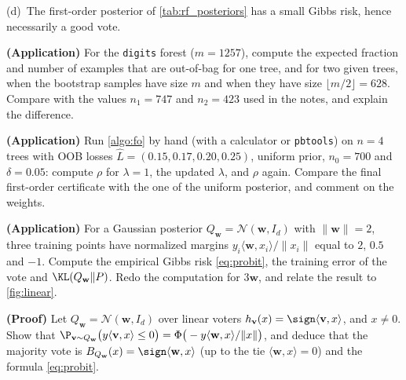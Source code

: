 \begin{exercises}
\begin{exercise}
(d)~The first-order posterior of \cref{tab:rf_posteriors} has a small Gibbs risk, hence
necessarily a good vote.
\end{exercise}
\begin{exercise}
\textbf{(Application)} For the \texttt{digits} forest ($m=1257$), compute the expected
fraction and number of examples that are out-of-bag for one tree, and for two given trees,
when the bootstrap samples have size $m$ and when they have size $\lfloor m/2\rfloor=628$.
Compare with the values $n_1=747$ and $n_2=423$ used in the notes, and explain the
difference.
\end{exercise}
\begin{exercise}
\textbf{(Application)} Run \cref{algo:fo} by hand (with a calculator or \texttt{pbtools}) on
$n=4$ trees with OOB losses $\widehat L=(0.15,0.17,0.20,0.25)$, uniform prior, $n_0=700$
and $\delta=0.05$: compute $\rho$ for $\lambda=1$, the updated $\lambda$, and $\rho$ again.
Compare the final first-order certificate with the one of the uniform posterior, and
comment on the weights.
\end{exercise}
\begin{exercise}
\textbf{(Application)} For a Gaussian posterior $Q_{\mathbf w}=\mathcal N(\mathbf w,I_d)$ with
$\|\mathbf w\|=2$, three training points have normalized margins
$y_i\langle\mathbf w,x_i\rangle/\|x_i\|$ equal to $2$, $0.5$ and $-1$. Compute the empirical
Gibbs risk \eqref{eq:probit}, the training error of the vote and $\KL(Q_{\mathbf w}\|P)$.
Redo the computation for $3\mathbf w$, and relate the result to \cref{fig:linear}.
\end{exercise}
\begin{exercise}
\textbf{(Proof)} Let $Q_{\mathbf w}=\mathcal N(\mathbf w,I_d)$ over linear voters
$h_{\mathbf v}(x)=\sign\langle\mathbf v,x\rangle$, and $x\neq0$. Show that
$\P_{\mathbf v\sim Q_{\mathbf w}}\big(y\langle\mathbf v,x\rangle\leq0\big)=\Phi\big(-y\langle\mathbf w,x\rangle/\|x\|\big)$,
and deduce that the majority vote is $B_{Q_{\mathbf w}}(x)=\sign\langle\mathbf w,x\rangle$ (up to the
tie $\langle\mathbf w,x\rangle=0$) and the formula \eqref{eq:probit}.
\end{exercise}
\end{exercises}
